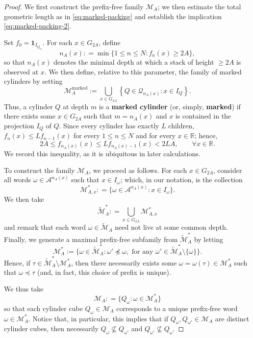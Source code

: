 \documentclass[12pt]{amsart}
\numberwithin{equation}{section}
\begin{document}
\begin{proof}
We first construct the prefix-free family $\mathscr{M}_A$; we then estimate the total geometric length as in \eqref{eq:marked-packing} and establish the implication \eqref{eq:marked-packing-2}.

Set $f_0=\mathbf1_{I_{Q_\varnothing}}$.  For each $x\in G_{2A}$, define
$$
n_A (x) : = \min \big\{1 \leq n \leq N : f_{n} (x) \geq 2 A \big\},
$$
so that $n_A (x)$ denotes the minimal depth at which a stack of height $\geq 2 A$ is observed at $x$. We then define, relative to this parameter, the family of marked cylinders by setting
$$
 \mathscr{M}^{\text{marked}}_A
 :=
 \bigcup_{x\in G_{2A}}
 \left\{
 Q\in\mathscr Q_{n_A(x)}:x\in I_Q
 \right\}.
$$
Thus, a cylinder $Q$ at depth $m$ is a \textbf{marked cylinder} (or, simply, \textbf{marked}) if there exists some $x \in G_{2A}$ such that $m = n_A (x)$ and $x$ is contained in the projection $I_Q$ of $Q$. Since every cylinder has exactly $L$ children, $f_n(x)\leq Lf_{n-1}(x)$ for every $1 \leq n \leq N$ and for every $x \in \mathbb{R}$; hence,
\begin{equation}\label{eq:first-crossing}
 2A\leq f_{n_A(x)}(x)
 \leq Lf_{n_A(x)-1}(x)<2LA, \qquad \forall x \in \mathbb{R}.
\end{equation}
We record this inequality, as it is ubiquitous in later calculations.
 
To construct the family $\mathscr{M}_A$, we proceed as follows. For each $x \in G_{2A}$, consider all words $\omega \in \mathcal{A}^{n_A(x)}$ such that $x \in I_{\omega}$; which, in our notation, is the collection
$$
\mathscr{M}_{A,x}^* : = \big\{\omega \in \mathcal{A}^{n_A(x)} : x \in I_{\omega} \big\}.
$$
We then take 
$$
\widetilde{\mathscr{M}}^*_{A} : = \bigcup_{x \in G_{2A}} \mathscr{M}_{A,x}^*
$$
and remark that each word $\omega \in \widetilde{\mathscr{M}}_{A}$ need not live at some common depth. Finally, we generate a maximal prefix-free subfamily from $\widetilde{\mathscr{M}}_{A}^*$ by letting
$$
\mathscr{M}_{A}^* := \big\{\omega \in \widetilde{\mathscr{M}}_{A}^* : \omega' \not\preceq \omega, \textrm{ for any } \omega' \in \widetilde{\mathscr{M}}^*_{A} \setminus \{\omega \}\big\}.
$$
Hence, if $\tau \in \widetilde{\mathscr{M}}_{A}^* \setminus  \mathscr{M}_{A}^*$, then there necessarily exists some $\omega = \omega(\tau) \in \mathscr{M}_{A}^*$ such that $\omega \preceq \tau$ (and, in fact, this choice of prefix is unique).

We thus take
$$
\mathscr{M}_A : = \big\{Q_{\omega} : \omega \in \mathscr{M}_A^* \big\}
$$
so that each cylinder cube $Q_{\omega} \in \mathscr{M}_A$ corresponds to a unique prefix-free word $\omega \in \mathscr{M}_A^*$. Notice that, in particular, this implies that if $Q_{\omega}, Q_{\omega'} \in \mathscr{M}_A$ are distinct cylinder cubes, then necessarily $Q_{\omega} \not\subseteq Q_{\omega'}$ and $Q_{\omega'} \not\subseteq Q_{\omega}$.


\end{proof}
\end{document}
